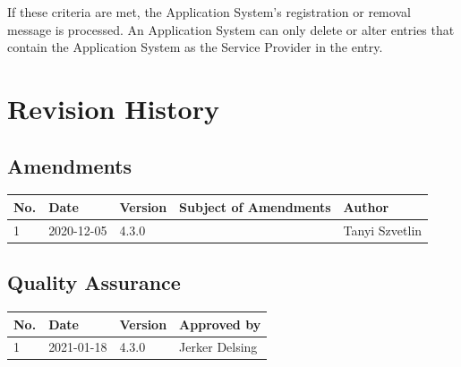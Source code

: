 \documentclass[a4paper]{arrowhead}
\begin{document}
 If these criteria are met, the Application System’s registration or removal message is processed. An Application System can only delete or alter entries that contain the Application System as the Service Provider in the entry.



\newpage




\newpage

\section{Revision History}
\subsection{Amendments}

\noindent\begin{tabularx}{\textwidth}{| p{1cm} | p{3cm} | p{2cm} | X | p{4cm} |} \hline
\rowcolor{gray!33} No. & Date & Version & Subject of Amendments & Author \\ \hline

1 & 2020-12-05 & 4.3.0 &  & Tanyi Szvetlin \\ \hline


\end{tabularx}

\subsection{Quality Assurance}

\noindent\begin{tabularx}{\textwidth}{| p{1cm} | p{3cm} | p{2cm} | X |} \hline
\rowcolor{gray!33} No. & Date & Version & Approved by \\ \hline

1 & 2021-01-18 & 4.3.0 & Jerker Delsing \\ \hline

\end{tabularx}
\end{document}
